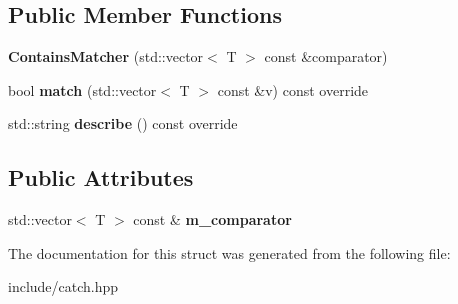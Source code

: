 \subsection*{Public Member Functions}
\begin{DoxyCompactItemize}
\item 
{\bfseries Contains\+Matcher} (std\+::vector$<$ T $>$ const \&comparator)\hypertarget{structCatch_1_1Matchers_1_1Vector_1_1ContainsMatcher_ad8e92c8399be6dce75bb5702cdfab700}{}\label{structCatch_1_1Matchers_1_1Vector_1_1ContainsMatcher_ad8e92c8399be6dce75bb5702cdfab700}

\item 
bool {\bfseries match} (std\+::vector$<$ T $>$ const \&v) const override\hypertarget{structCatch_1_1Matchers_1_1Vector_1_1ContainsMatcher_afd33467ae48a41a634572b41b053f67f}{}\label{structCatch_1_1Matchers_1_1Vector_1_1ContainsMatcher_afd33467ae48a41a634572b41b053f67f}

\item 
std\+::string {\bfseries describe} () const override\hypertarget{structCatch_1_1Matchers_1_1Vector_1_1ContainsMatcher_abe6a9ea3d6506c9a1f75ff524f35832e}{}\label{structCatch_1_1Matchers_1_1Vector_1_1ContainsMatcher_abe6a9ea3d6506c9a1f75ff524f35832e}

\end{DoxyCompactItemize}
\subsection*{Public Attributes}
\begin{DoxyCompactItemize}
\item 
std\+::vector$<$ T $>$ const \& {\bfseries m\+\_\+comparator}\hypertarget{structCatch_1_1Matchers_1_1Vector_1_1ContainsMatcher_a83d051166e4ed0d535219ad6ee99abb2}{}\label{structCatch_1_1Matchers_1_1Vector_1_1ContainsMatcher_a83d051166e4ed0d535219ad6ee99abb2}

\end{DoxyCompactItemize}


The documentation for this struct was generated from the following file\+:\begin{DoxyCompactItemize}
\item 
include/catch.\+hpp\end{DoxyCompactItemize}
